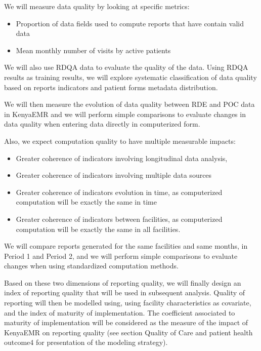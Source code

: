 \documentclass[a4paper,11pt,final,twoside]{article}
\begin{document}

We will measure data quality by looking at specific metrics:
\begin{itemize}
\item	Proportion of data fields used to compute reports that have contain valid data
\item	Mean monthly number of visits by active patients
\end{itemize}

We will also use RDQA data to evaluate the quality of the data. Using RDQA results as training results, we will explore systematic classification of data quality based on reports indicators and patient forms metadata distribution.

We will then measure the evolution of data quality between RDE and POC data in KenyaEMR and we will perform simple comparisons to evaluate changes in data quality when entering data directly in computerized form.

Also, we expect computation quality to have multiple measurable impacts:
\begin{itemize}
\item	Greater coherence of indicators involving longitudinal data analysis,
\item	Greater coherence of indicators involving multiple data sources
\item	Greater coherence of indicators evolution in time, as computerized computation will be exactly the same in time
\item	Greater coherence of indicators between facilities, as computerized computation will be exactly the same in all facilities.
\end{itemize}

We will compare reports generated for the same facilities and same months, in Period 1 and Period 2, and we will perform simple comparisons to evaluate changes when using standardized computation methods.

Based on these two dimensions of reporting quality, we will finally design an index of reporting quality that will be used in subsequent analysis. Quality of reporting will then be modelled using, using facility characteristics as covariate, and the index of maturity of implementation. The coefficient associated to maturity of implementation will be considered as the measure of the impact of KenyaEMR on reporting quality (see section Quality of Care and patient health outcome4 for presentation of the modeling strategy).
\end{document}
